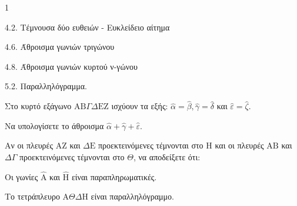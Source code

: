 \begin{ylh}{1}
    \item 4.2. Τέμνουσα δύο ευθειών - Ευκλείδειο αίτημα
    \item 4.6. Άθροισμα γωνιών τριγώνου
    \item 4.8. Άθροισμα γωνιών κυρτού ν-γώνου
    \item 5.2. Παραλληλόγραμμα.
\end{ylh}
Στο κυρτό εξάγωνο $\mathrm{A}\mathrm{B}\Gamma\Delta\mathrm{E}\mathrm{Z}$ ισχύουν τα εξής: $\hat{\alpha} = \hat{\beta}, \hat{\gamma} = \hat{\delta}$ και $\hat{\varepsilon} = \hat{\zeta}$.
\begin{alist}
    \item Να υπολογίσετε το άθροισμα $\hat{\alpha} + \hat{\gamma} + \hat{\varepsilon}$. 
    \item Αν οι πλευρές $\mathrm{A}\mathrm{Z}$ και $\Delta\mathrm{E}$ προεκτεινόμενες τέμνονται στο $\mathrm{H}$ και οι πλευρές $\mathrm{A}\mathrm{B}$ και $\Delta\Gamma$ προεκτεινόμενες τέμνονται στο $\Theta$, να αποδείξετε ότι:
    \begin{rlist}
        \item Οι γωνίες $\hat{\mathrm{A}}$ και $\hat{\mathrm{H}}$ είναι παραπληρωματικές. 
        \item Το τετράπλευρο $\mathrm{A}\Theta\Delta\mathrm{H}$ είναι παραλληλόγραμμο. 
    \end{rlist}
\end{alist}
